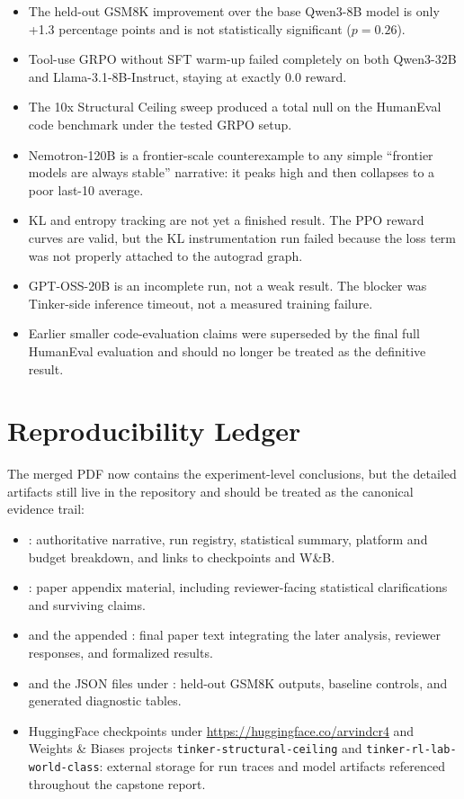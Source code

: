 \begin{itemize}
\item The held-out GSM8K improvement over the base Qwen3-8B model is only
+1.3 percentage points and is not statistically significant ($p=0.26$).
\item Tool-use GRPO without SFT warm-up failed completely on both
Qwen3-32B and Llama-3.1-8B-Instruct, staying at exactly 0.0 reward.
\item The 10x Structural Ceiling sweep produced a total null on the HumanEval
code benchmark under the tested GRPO setup.
\item Nemotron-120B is a frontier-scale counterexample to any simple
``frontier models are always stable'' narrative: it peaks high and then
collapses to a poor last-10 average.
\item KL and entropy tracking are not yet a finished result. The PPO reward
curves are valid, but the KL instrumentation run failed because the loss term
was not properly attached to the autograd graph.
\item GPT-OSS-20B is an incomplete run, not a weak result. The blocker was
Tinker-side inference timeout, not a measured training failure.
\item Earlier smaller code-evaluation claims were superseded by the final full
HumanEval evaluation and should no longer be treated as the definitive result.
\end{itemize}

\section*{Reproducibility Ledger}

The merged PDF now contains the experiment-level conclusions, but the detailed
artifacts still live in the repository and should be treated as the canonical
evidence trail:

\begin{itemize}
\item {}: authoritative narrative,
run registry, statistical summary, platform and budget breakdown, and links to
checkpoints and W\&B.
\item {}: paper appendix material,
including reviewer-facing statistical clarifications and surviving claims.
\item {} and the appended : final paper
text integrating the later analysis, reviewer responses, and formalized
results.
\item {} and the JSON files under
: held-out GSM8K outputs, baseline controls, and generated
diagnostic tables.
\item HuggingFace checkpoints under \url{https://huggingface.co/arvindcr4} and
Weights \& Biases projects \texttt{tinker-structural-ceiling} and
\texttt{tinker-rl-lab-world-class}: external storage for run traces and model
artifacts referenced throughout the capstone report.
\end{itemize}

